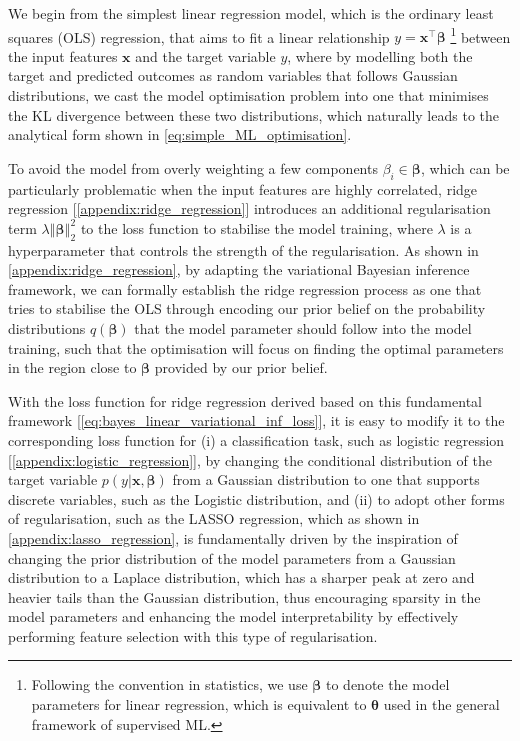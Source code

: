 We begin from the simplest linear regression model, which is the ordinary least squares (OLS) regression, that aims to fit a linear relationship $y=\bm{x}^\top\boldsymbol{\beta}$ \footnote{Following the convention in statistics, we use $\boldsymbol{\beta}$ to denote the model parameters for linear regression, which is equivalent to $\boldsymbol{\theta}$ used in the general framework of supervised ML.} between the input features $\bm{x}$ and the target variable $y$, where by modelling both the target and predicted outcomes as random variables that follows Gaussian distributions, we cast the model optimisation problem into one that minimises the KL divergence between these two distributions, which naturally leads to the analytical form shown in \cref{eq:simple_ML_optimisation}. 

To avoid the model from overly weighting a few components $\beta_i\in\boldsymbol{\beta}$, which can be particularly problematic when the input features are highly correlated, ridge regression [\cref{appendix:ridge_regression}] introduces an additional regularisation term $\lambda\left\Vert \boldsymbol{\beta}\right\Vert^2_2$ to the loss function to stabilise the model training, where $\lambda$ is a hyperparameter that controls the strength of the regularisation. As shown in \cref{appendix:ridge_regression}, by adapting the variational Bayesian inference framework, we can formally establish the ridge regression process as one that tries to stabilise the OLS through encoding our prior belief on the probability distributions $q(\boldsymbol{\beta})$ that the model parameter should follow into the model training, such that the optimisation will focus on finding the optimal parameters in the region close to $\boldsymbol{\beta}$ provided by our prior belief. 

With the loss function for ridge regression derived based on this fundamental framework [\cref{eq:bayes_linear_variational_inf_loss}], it is easy to modify it to the corresponding loss function for (i) a classification task, such as logistic regression [\cref{appendix:logistic_regression}], by changing the conditional distribution of the target variable $p(y|\bm{x},\boldsymbol{\beta})$ from a Gaussian distribution to one that supports discrete variables, such as the Logistic distribution, and (ii) to adopt other forms of regularisation, such as the LASSO  regression, which as shown in \cref{appendix:lasso_regression}, is fundamentally driven by the inspiration of changing the prior distribution of the model parameters from a Gaussian distribution to a Laplace distribution, which has a sharper peak at zero and heavier tails than the Gaussian distribution, thus encouraging sparsity in the model parameters and enhancing the model interpretability by effectively performing feature selection with this type of regularisation. 

